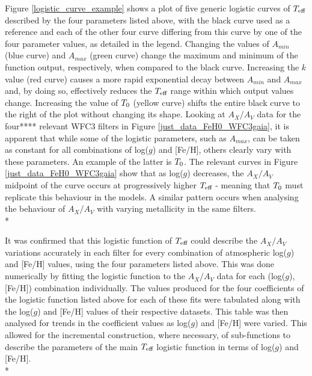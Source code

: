 \documentclass[12pt, a4paper]{report}
\begin{document}
Figure \ref{logistic_curve_example} shows a plot of five generic logistic curves of $T_{\textnormal{eff}}$ described by the four parameters listed above, with the black curve used as a reference and each of the other four curve differing from this curve by one of the four parameter values, as detailed in the legend. Changing the values of $A_{min}$ (blue curve) and $A_{max}$ (green curve) change the maximum and minimum of the function output, respectively, when compared to the black curve. Increasing the $k$ value (red curve) causes a more rapid exponential decay between $A_{min}$ and $A_{max}$ and, by doing so, effectively reduces the $T_{\textnormal{eff}}$ range within which output values change. Increasing the value of $T_{\textnormal{0}}$ (yellow curve) shifts the entire black curve to the right of the plot without changing its shape. Looking at $A_{X}/A_{V}$ data for the four**** relevant WFC3 filters in Figure \ref{just_data_FeH0_WFC3gaia}, it is apparent that while some of the logistic parameters, such as $A_{max}$, can be taken as constant for all combinations of log($g$) and [Fe/H], others clearly vary with these parameters. An example of the latter is $T_{\textnormal{0}}$. The relevant curves in Figure \ref{just_data_FeH0_WFC3gaia} show that as log($g$) decreases, the $A_{X}/A_{V}$ midpoint of the curve occurs at progressively higher $T_{\textnormal{eff}}$ - meaning that $T_{\textnormal{0}}$ must replicate this behaviour in the models. A similar pattern occurs when analysing the behaviour of $A_{X}/A_{V}$ with varying metallicity in the same filters. \\*

It was confirmed that this logistic function of $T_{\textnormal{eff}}$ could describe the $A_{X}/A_{V}$ variations accurately in each filter for every combination of atmospheric log($g$) and [Fe/H] values, using the four parameters listed above. This was done numerically by fitting the logistic function to the $A_{X}/A_{V}$ data for each (log($g$),[Fe/H]) combination individually. The values produced for the four coefficients of the logistic function listed above for each of these fits were tabulated along with the log($g$) and [Fe/H] values of their respective datasets. This table was then analysed for trends in the coefficient values as log($g$) and [Fe/H] were varied. This allowed for the incremental construction, where necessary, of sub-functions to describe the parameters of the main $T_{\textnormal{eff}}$ logistic function in terms of log($g$) and [Fe/H].\\*
\end{document}
